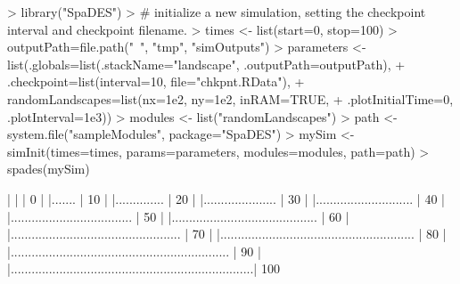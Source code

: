 \documentclass{article}
\begin{document}
\begin{Schunk}
\begin{Sinput}
> library("SpaDES")
> # initialize a new simulation, setting the checkpoint interval and checkpoint filename.
> times <- list(start=0, stop=100)
> outputPath=file.path("~", "tmp", "simOutputs")
> parameters <- list(.globals=list(.stackName="landscape", .outputPath=outputPath),
+                    .checkpoint=list(interval=10, file="chkpnt.RData"),
+                    randomLandscapes=list(nx=1e2, ny=1e2, inRAM=TRUE,
+                                          .plotInitialTime=0, .plotInterval=1e3))
> modules <- list("randomLandscapes")
> path <- system.file("sampleModules", package="SpaDES")
> mySim <- simInit(times=times, params=parameters, modules=modules, path=path)
> spades(mySim)
\end{Sinput}
\begin{Soutput}
  |                                                                            
  |                                                                      |   0%
  |                                                                            
  |.......                                                               |  10%
  |                                                                            
  |..............                                                        |  20%
  |                                                                            
  |.....................                                                 |  30%
  |                                                                            
  |............................                                          |  40%
  |                                                                            
  |...................................                                   |  50%
  |                                                                            
  |..........................................                            |  60%
  |                                                                            
  |.................................................                     |  70%
  |                                                                            
  |........................................................              |  80%
  |                                                                            
  |...............................................................       |  90%
  |                                                                            
  |......................................................................| 100%
\end{Soutput}
\end{Schunk}
\end{document}
